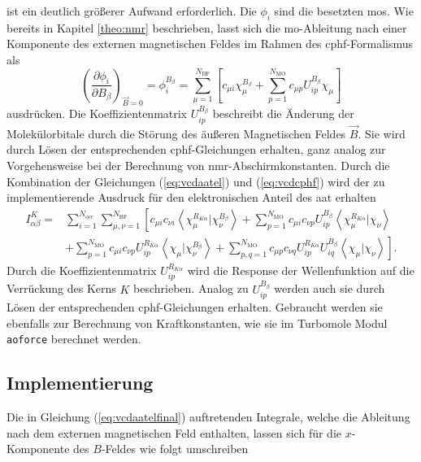     ist ein deutlich größerer Aufwand erforderlich. Die $\phi_i$ sind die besetzten \acp{mo}. Wie bereits in Kapitel \ref{theo:nmr} beschrieben, lasst sich die \ac{mo}-Ableitung nach einer Komponente des externen magnetischen Feldes im Rahmen des \ac{cphf}-Formalismus als 
    \begin{equation}\label{eq:vcdcphf}
    \left(\frac{\partial \phi_i}{\partial B_\beta}\right)_{\vec{B}=0}=\phi_i^{B_\beta}=\sum_{\mu=1}^{N_{\text{BF}}}\left[c_{\mu i}\chi_\mu^{B_\beta}+\sum_{p=1}^{N_{\text{MO}}}c_{\mu p}U_{ip}^{B_\beta}\chi_\mu\right]
	\end{equation}
	ausdrücken. Die Koeffizientenmatrix $U_{ip}^{B_\beta}$ beschreibt die Änderung der Molekülorbitale durch die Störung des äußeren Magnetischen Feldes $\vec{B}$. Sie wird durch Lösen der entsprechenden \ac{cphf}-Gleichungen erhalten, ganz analog zur Vorgehensweise bei der Berechnung von \ac{nmr}-Abschirmkonstanten. Durch die Kombination der Gleichungen (\ref{eq:vcdaatel}) und  (\ref{eq:vcdcphf}) wird der zu implementierende Ausdruck für den elektronischen Anteil des \ac{aat} erhalten
	\begin{equation}\label{eq:vcdaatelfinal}
	\begin{aligned}
	I^K_{\alpha\beta}=&\sum_{i=1}^{N_{\text{occ}}}\sum_{\mu,\nu=1}^{N_{\text{BF}}}\left[c_{\mu i}c_{\nu i}\left\langle\chi_\mu^{R_{K\alpha}}\vert\chi_\nu^{B_\beta}\right\rangle+\sum_{p=1}^{N_{\text{MO}}}c_{\mu i}c_{\nu p}U_{ip}^{B_\beta}\left\langle\chi_\mu^{R_{K\alpha}}\vert\chi_\nu\right\rangle\right.\\
	&\left.+\sum_{p=1}^{N_{\text{MO}}}c_{\mu i}c_{\nu p}U_{ip}^{R_{K\alpha}}\left\langle\chi_\mu\vert\chi_\nu^{B_{\beta}}\right\rangle+\sum_{p,q=1}^{N_{\text{MO}}}c_{\mu p}c_{\nu q}U_{ip}^{R_{K\alpha}}U_{iq}^{B_\beta}\left\langle\chi_\mu\vert\chi_\nu\right\rangle\right].
	\end{aligned}
	\end{equation}
	Durch die Koeffizientenmatrix $U_{ip}^{R_{K\alpha}}$ wird die Response der Wellenfunktion auf die Verrückung des Kerns $K$ beschrieben. Analog zu $U_{ip}^{B_\beta}$ werden auch sie durch Lösen der entsprechenden \ac{cphf}-Gleichungen erhalten. Gebraucht werden sie ebenfalls zur Berechnung von Kraftkonstanten, wie sie im \textsf{Turbomole} Modul \texttt{aoforce}\supercite{deglmann2002efficient} berechnet werden.
	\subsection{Implementierung}
	Die in Gleichung (\ref{eq:vcdaatelfinal}) auftretenden Integrale, welche die Ableitung nach dem externen magnetischen Feld enthalten, lassen sich für die $x$-Komponente des $B$-Feldes wie folgt umschreiben
	
